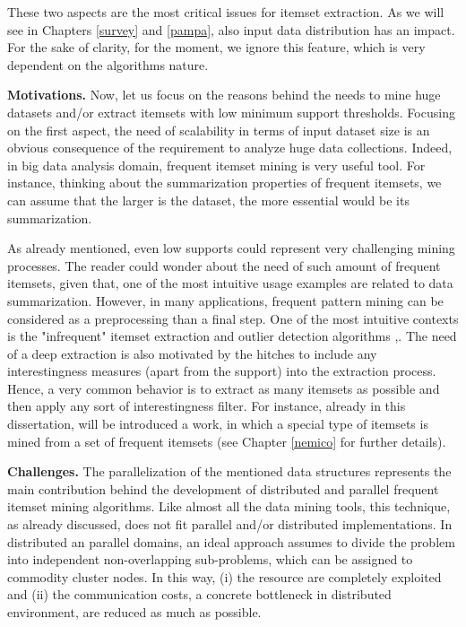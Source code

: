 These two aspects are the most critical issues for itemset extraction. As we will see in Chapters \ref{survey} and \ref{pampa}, also input data distribution has an impact. For the sake of clarity, for the moment, we ignore this feature, which is very dependent on the algorithms nature. 
 

\textbf{Motivations.} Now, let us focus on the reasons behind the needs to mine huge datasets and/or extract itemsets with low minimum support thresholds. Focusing on the first aspect, the need of scalability in terms of input dataset size is an obvious consequence of the requirement to analyze huge data collections. Indeed, in big data analysis domain, frequent itemset mining is very useful tool. For instance, thinking about the summarization properties of frequent itemsets, we can assume that the larger is the dataset, the more essential would be its summarization.

As already mentioned, even low supports could represent very challenging mining processes. 
The reader could wonder about the need of such amount of frequent itemsets, given that, one of the most intuitive usage examples are related to data summarization.
However, in many applications, frequent pattern mining can be considered as a preprocessing than a final step. One of the most intuitive contexts is the "infrequent" itemset extraction and outlier detection algorithms \cite{cagliero2014infrequent},\cite{brauckhoff2012anomaly}. 
The need of a deep extraction is also motivated by the hitches to include any interestingness measures (apart from the support) into the extraction process. Hence, a very common behavior is to extract as many itemsets as possible and then apply any sort of interestingness filter. 
For instance, already in this dissertation, will be introduced a work, in which a special type of itemsets is mined from a set of frequent itemsets (see Chapter \ref{nemico} for further details).


\textbf{Challenges.} The parallelization of the mentioned data structures represents the main contribution behind the development of distributed and parallel frequent itemset mining algorithms. Like almost all the data mining tools, this technique, as already discussed, does not fit parallel and/or distributed implementations. 
In distributed an parallel domains, an ideal approach assumes to divide the problem into independent non-overlapping sub-problems, which can be assigned to commodity cluster nodes. In this way, (i) the resource are completely exploited and (ii) the communication costs, a concrete bottleneck in distributed environment, are reduced as much as possible.

